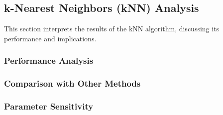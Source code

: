 \subsection{k-Nearest Neighbors (kNN) Analysis}
\label{subsec:discussion-knn}

This section interprets the results of the kNN algorithm, discussing its performance and implications.


\subsubsection{Performance Analysis}

\subsubsection{Comparison with Other Methods}

\subsubsection{Parameter Sensitivity}

